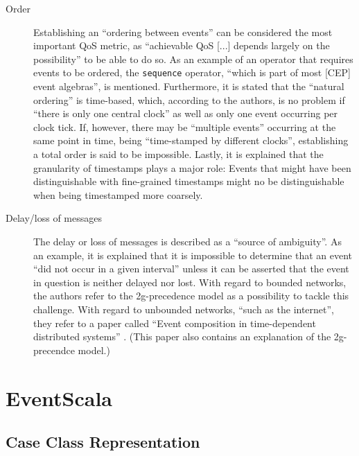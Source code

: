 \documentclass[article, 10pt, type=bsc, colorback, accentcolor=tud8b, parskip=half, bibliography=totocnumbered]{tudthesis}
\begin{document}
\begin{description}
\item[Order]
Establishing an ``ordering between events'' can be considered the most important QoS metric, as ``achievable QoS [...] depends largely on the possibility'' to be able to do so.
As an example of an operator that requires events to be ordered, the \lstinline{sequence} operator, ``which is part of most [CEP] event algebras'', is mentioned.
Furthermore, it is stated that the ``natural ordering'' is time-based, which, according to the authors, is no problem if ``there is only one central clock'' as well as only one event occurring per clock tick.
If, however, there may be ``multiple events'' occurring at the same point in time, being ``time-stamped by different clocks'', establishing a total order is said to be impossible.
Lastly, it is explained that the granularity of timestamps plays a major role:
Events that might have been distinguishable with fine-grained timestamps might no be distinguishable when being timestamped more coarsely.
\item[Delay/loss of messages]
The delay or loss of messages is described as a ``source of ambiguity''.
As an example, it is explained that it is impossible to determine that an event ``did not occur in a given interval'' unless it can be asserted that the event in question is neither delayed nor lost.
With regard to bounded networks, the authors refer to the 2g-precedence model as a possibility to tackle this challenge.
With regard to unbounded networks, ``such as the internet'', they refer to a paper called ``Event composition in time-dependent distributed systems'' \cite{792159}. (This paper also contains an explanation of the 2g-precendce model.)
\end{description}

\newpage

\section{EventScala}
\label{sec:eventscala}


\subsection{Case Class Representation}
\label{sec:case_class_rep}
\end{document}
